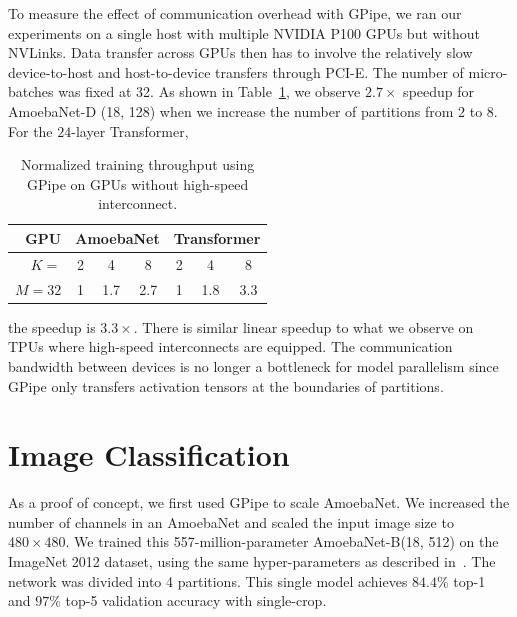 \documentclass{article}
\def\codename{GPipe}
\begin{document}
To measure the effect of communication overhead with \codename{}, we ran our experiments on a single host with multiple NVIDIA P100 GPUs but without NVLinks. Data transfer across GPUs then has to involve the relatively slow device-to-host and host-to-device transfers through PCI-E. The number of micro-batches was fixed at 32. As shown in Table~\ref{results_comm_tab}, we observe $2.7\times$ speedup for AmoebaNet-D (18, 128) when we increase the number of partitions from $2$ to $8$. For the $24$-layer Transformer,
\begin{table}
\begin{small}
\begin{center}
\caption{Normalized training throughput using \codename{} on GPUs without high-speed interconnect.}
\label{results_comm_tab}
\begin{tabular}{rcccccc}
\toprule
GPU & \multicolumn{3}{c}{AmoebaNet} & \multicolumn{3}{c}{Transformer}  \\
 \midrule
 $K=$ & 2 & 4 & 8 & 2 & 4 & 8\\\hline
 $M=32$ & 1 & 1.7 & 2.7 &  1 & 1.8 & 3.3 \\
\bottomrule
\end{tabular}
\end{center}
\end{small}
\end{table}
the speedup is $3.3\times$. There is similar linear speedup to what we observe on TPUs where high-speed interconnects are equipped. The communication bandwidth between devices is no longer a bottleneck for model parallelism since \codename{} only transfers activation tensors at the boundaries of partitions. 


\section{Image Classification}
\label{section:imagenet_results}
As a proof of concept, we first used \codename{} to scale AmoebaNet. We increased the number of channels in an AmoebaNet and scaled the input image size to $480\times480$. We trained this 557-million-parameter AmoebaNet-B(18, 512) on the ImageNet 2012 dataset, using the same hyper-parameters as described in~\cite{real2018regularized}. The network was divided into 4 partitions. This single model achieves $84.4\%$ top-1 and $97\%$ top-5 validation accuracy with single-crop.
\end{document}
